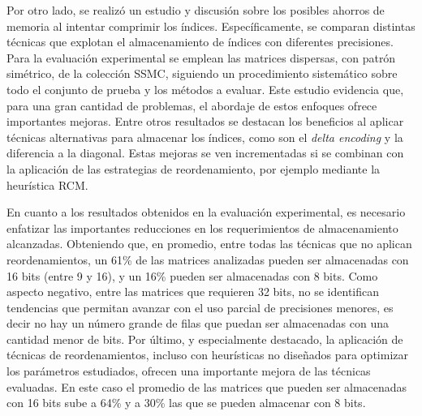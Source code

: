 Por otro lado, se realizó un estudio y discusión sobre los posibles ahorros de memoria al intentar comprimir los índices. Específicamente, se comparan distintas técnicas que explotan el almacenamiento de índices con diferentes precisiones. Para la evaluación experimental se emplean las matrices dispersas, con patrón simétrico, de la colección SSMC, siguiendo un procedimiento sistemático sobre todo el conjunto de prueba y los métodos a evaluar. Este estudio evidencia que, para una gran cantidad de problemas, el abordaje de estos enfoques ofrece importantes mejoras. 
Entre otros resultados se destacan los beneficios al aplicar técnicas alternativas para almacenar los índices, como son el \textit{delta encoding} y la diferencia a la diagonal. Estas mejoras se ven incrementadas si se combinan con la aplicación de las estrategias de reordenamiento, por ejemplo mediante la heurística RCM.

En cuanto a los resultados obtenidos en la evaluación experimental, es necesario enfatizar las importantes reducciones en los requerimientos de almacenamiento alcanzadas. Obteniendo que, en promedio, entre todas las técnicas que no aplican reordenamientos, un 61\% de las matrices analizadas pueden ser almacenadas con 16 bits (entre 9 y 16), y un 16\% pueden ser almacenadas con 8 bits. 
Como aspecto negativo, entre las matrices que requieren 32 bits, no se identifican tendencias que permitan avanzar con el uso parcial de precisiones menores, es decir no hay un número grande de filas que puedan ser almacenadas con una cantidad menor de bits.
Por último, y especialmente destacado, la aplicación de técnicas de reordenamientos, incluso con heurísticas no diseñados para optimizar los parámetros estudiados, ofrecen una importante mejora de las técnicas evaluadas.
En este caso el promedio de las matrices que pueden ser almacenadas con 16 bits sube a 64\% y a 30\% las que se pueden almacenar con 8 bits.



